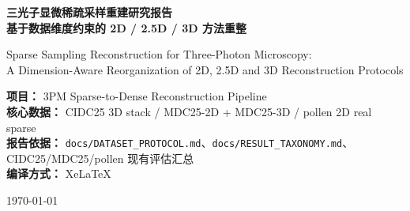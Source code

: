 \documentclass[UTF8, scheme=plain, 11pt, a4paper]{ctexart}
\begin{document}
\begin{titlepage}
  \centering
  \vspace*{1.6cm}
  {\LARGE\bfseries 三光子显微稀疏采样重建研究报告\\[0.5em]
  基于数据维度约束的 2D / 2.5D / 3D 方法重整\par}
  \vspace{0.8em}
  {\large Sparse Sampling Reconstruction for Three-Photon Microscopy:\\
  A Dimension-Aware Reorganization of 2D, 2.5D and 3D Reconstruction Protocols\par}
  \vspace{1.6em}
  {\normalsize
  \textbf{项目：} 3PM Sparse-to-Dense Reconstruction Pipeline\\[0.35em]
  \textbf{核心数据：} CIDC25 3D stack / MDC25-2D + MDC25-3D / pollen 2D real sparse\\[0.35em]
  \textbf{报告依据：} \texttt{docs/DATASET\_PROTOCOL.md}、\texttt{docs/RESULT\_TAXONOMY.md}、CIDC25/MDC25/pollen 现有评估汇总\\[0.35em]
  \textbf{编译方式：} XeLaTeX\par}
  \vspace{1.2em}
  {\small \today}
  \vfill
\end{titlepage}

\tableofcontents
\newpage

\begin{abstract}
三光子显微成像在深层组织观测中具有高穿透、低散射优势，但受限于光子预算、扫描速度与光毒性之间的矛盾。稀疏采样后重建是一条直接的加速路径：通过降低空间或轴向采样密度减少采集成本，再用学习模型恢复稠密图像或体数据。本项目前期已经完成大量 2D、2.5D、3D 模型与 CIDC25、MDC25、pollen 数据集上的实验，但由于数据维度、模型维度与评估目标混杂，导致结果解释不稳定。

本报告依据重整后的实验主线，首先冻结数据集协议：CIDC25 作为 3D stack 主数据集，MDC25 拆分为 2D Nuclei 与 3D Tribolium 两个子协议，pollen 当前作为 2D real sparse 外部样本。随后，将 2D 模型限定为 2D 图像或 3D 逐切面 baseline，将 2.5D 模型定义为邻切面输入、中心切面输出，将 3D 模型限定为体块输入、体块输出。基于该协议，本报告系统整理实验目标、总体设计、稀疏退化建模、重建方法、PSF 物理先验、主要结果和局限性。

现有结果支持两个相对稳健的结论：第一，在 CIDC25/F0 协议内，2.5D + Z sparse 是中心切面重建的强路径，K=4 时达到 50.10 dB / 0.9912，K=2 时达到 51.72 dB / 0.9942；第二，3D + Wiener 初始化在困难 XY sparse 场景下明显改善 K=4 表现，由普通 3D 的 21.19 dB / 0.5251 提升到 38.50 dB / 0.9169。MDC25 与 pollen 结果目前更适合作为跨数据压力测试或外部迁移探索，不应与 CIDC25 主结果混排。
\end{abstract}
\end{document}
